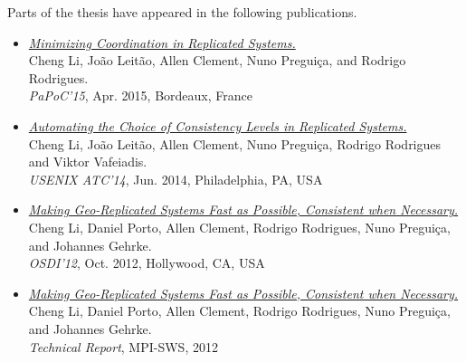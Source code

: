 \clearpage

{\Large Parts of the thesis have appeared in the following publications.}
\begin{center}

\begin{itemize}
 \item \href{http://dl.acm.org/citation.cfm?id=2745955}{{\em Minimizing Coordination in Replicated Systems.}}\\
  Cheng Li, Jo{\~a}o Leit{\~ a}o, Allen Clement, Nuno Pregui{\c c}a, and Rodrigo Rodrigues.\\
  \emph{PaPoC'15}, Apr. 2015, Bordeaux, France
 \item \href{https://www.usenix.org/system/files/conference/atc14/atc14-paper-li_cheng.pdf}{{\em Automating the Choice of Consistency Levels in Replicated Systems.}}\\
  Cheng Li, Jo{\~a}o Leit{\~ a}o, Allen Clement, Nuno Pregui{\c c}a, Rodrigo Rodrigues and Viktor Vafeiadis.\\
 \emph{USENIX ATC'14}, Jun. 2014, Philadelphia, PA, USA
 \item \href{https://www.usenix.org/system/files/conference/osdi12/osdi12-final-162.pdf}{{\em Making Geo-Replicated Systems Fast as Possible, Consistent when Necessary.}}\\
  Cheng Li, Daniel Porto, Allen Clement, Rodrigo Rodrigues, Nuno Pregui{\c c}a, and Johannes Gehrke.\\
 \emph{OSDI'12}, Oct. 2012, Hollywood, CA, USA
 \item \href{http://www.mpi-sws.org/~chengli/trs/rbTR.pdf}{{\em Making Geo-Replicated Systems Fast as Possible, Consistent when Necessary.}}\\
Cheng Li, Daniel Porto, Allen Clement, Rodrigo Rodrigues, Nuno Pregui{\c c}a, and Johannes Gehrke.\\
 \emph{Technical Report}, MPI-SWS, 2012
\end{itemize}
\end{center}

